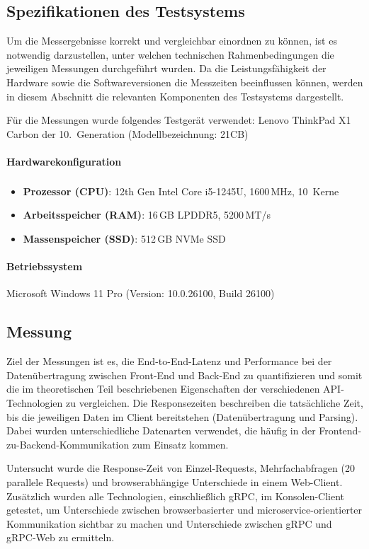 \clearpage
\subsection{Spezifikationen des Testsystems}
Um die Messergebnisse korrekt und vergleichbar einordnen zu können, ist es notwendig darzustellen, unter welchen technischen Rahmenbedingungen die jeweiligen Messungen durchgeführt wurden. Da die Leistungsfähigkeit der Hardware sowie die Softwareversionen die Messzeiten beeinflussen können, werden in diesem Abschnitt die relevanten Komponenten des Testsystems dargestellt.

Für die Messungen wurde folgendes Testgerät verwendet:  
Lenovo ThinkPad X1 Carbon der 10.\ Generation (Modellbezeichnung: 21CB)

\paragraph{Hardwarekonfiguration}
\begin{itemize}
	\item \textbf{Prozessor (CPU)}: 12th Gen Intel\textsuperscript{\textregistered} Core\texttrademark{} i5-1245U, 1600\,MHz, 10~Kerne
	\item \textbf{Arbeitsspeicher (RAM)}: 16\,GB LPDDR5, 5200\,MT/s
	\item \textbf{Massenspeicher (SSD)}: 512\,GB NVMe SSD
\end{itemize}

\paragraph{Betriebssystem}
Microsoft Windows 11 Pro (Version: 10.0.26100, Build 26100)

\clearpage
\subsection{Messung}
Ziel der Messungen ist es, die End-to-End-Latenz und Performance bei der Datenübertragung zwischen Front-End und Back-End zu quantifizieren und somit die im theoretischen Teil beschriebenen Eigenschaften der verschiedenen API-Technologien zu vergleichen.  
Die Responsezeiten beschreiben die tatsächliche Zeit, bis die jeweiligen Daten im Client bereitstehen (Datenübertragung und Parsing). Dabei wurden unterschiedliche Datenarten verwendet, die häufig in der Frontend-zu-Backend-Kommunikation zum Einsatz kommen.  

Untersucht wurde die Response-Zeit von Einzel-Requests, Mehrfachabfragen (20 parallele Requests) und browserabhängige Unterschiede in einem Web-Client. Zusätzlich wurden alle Technologien, einschließlich gRPC, im Konsolen-Client getestet, um Unterschiede zwischen browserbasierter und microservice-orientierter Kommunikation sichtbar zu machen und Unterschiede zwischen gRPC und gRPC-Web zu ermitteln.


